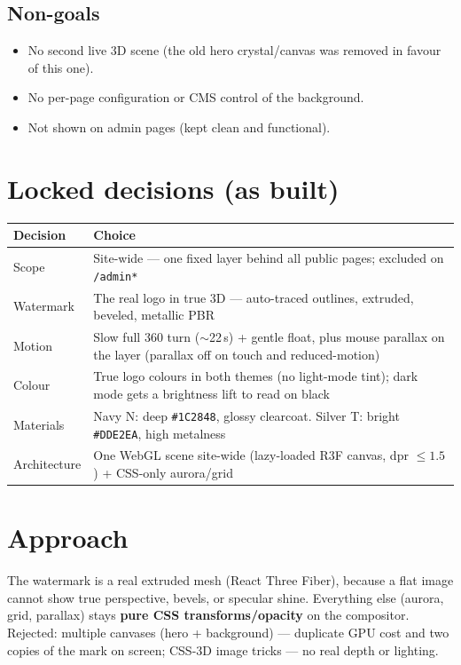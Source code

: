 \documentclass[11pt,a4paper]{article}
\begin{document}
\subsection{Non-goals}
\begin{itemize}
  \item No second live 3D scene (the old hero crystal/canvas was removed in favour of this one).
  \item No per-page configuration or CMS control of the background.
  \item Not shown on admin pages (kept clean and functional).
\end{itemize}

\section{Locked decisions (as built)}
\begin{center}
\begin{tabularx}{\textwidth}{l Y}
\toprule
\textbf{Decision} & \textbf{Choice}\\
\midrule
Scope & Site-wide --- one fixed layer behind all public pages; excluded on \texttt{/admin*}\\
Watermark & The real logo in true 3D --- auto-traced outlines, extruded, beveled, metallic PBR\\
Motion & Slow full 360\textdegree{} turn ($\sim$22\,s) + gentle float, plus mouse parallax on
the layer (parallax off on touch and reduced-motion)\\
Colour & True logo colours in both themes (no light-mode tint); dark mode gets a brightness
lift to read on black\\
Materials & Navy N: deep \texttt{\#1C2848}, glossy clearcoat. Silver T: bright
\texttt{\#DDE2EA}, high metalness\\
Architecture & One WebGL scene site-wide (lazy-loaded R3F canvas, dpr $\le 1.5$) + CSS-only
aurora/grid\\
\bottomrule
\end{tabularx}
\end{center}

\section{Approach}
The watermark is a real extruded mesh (React Three Fiber), because a flat image cannot show
true perspective, bevels, or specular shine. Everything else (aurora, grid, parallax) stays
\textbf{pure CSS transforms/opacity} on the compositor. Rejected: multiple canvases (hero +
background) --- duplicate GPU cost and two copies of the mark on screen; CSS-3D image tricks ---
no real depth or lighting.
\end{document}
